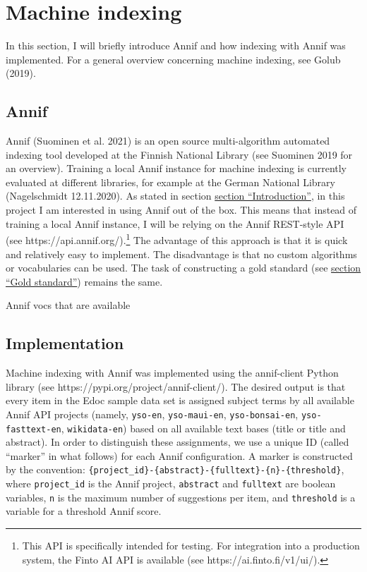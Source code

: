 \hypertarget{machine-indexing}{%
\section{Machine indexing}\label{machine-indexing}}

In this section, I will briefly introduce Annif and how indexing with
Annif was implemented. For a general overview concerning machine
indexing, see Golub (2019).

\hypertarget{annif}{%
\subsection{Annif}\label{annif}}

Annif (Suominen et al. 2021) is an open source multi-algorithm automated
indexing tool developed at the Finnish National Library (see Suominen
2019 for an overview). Training a local Annif instance for machine
indexing is currently evaluated at different libraries, for example at
the German National Library (Nagelschmidt 12.11.2020). As stated in
section \protect\hyperlink{introduction}{section ``Introduction''}, in
this project I am interested in using Annif out of the box. This means
that instead of training a local Annif instance, I will be relying on
the Annif REST-style API (see https://api.annif.org/).\footnote{This API
  is specifically intended for testing. For integration into a
  production system, the Finto AI API is available (see
  https://ai.finto.fi/v1/ui/).} The advantage of this approach is that
it is quick and relatively easy to implement. The disadvantage is that
no custom algorithms or vocabularies can be used. The task of
constructing a gold standard (see
\protect\hyperlink{gold-standard}{section ``Gold standard''}) remains
the same.

Annif vocs that are available

\hypertarget{implementation}{%
\subsection{Implementation}\label{implementation}}

Machine indexing with Annif was implemented using the annif-client
Python library (see https://pypi.org/project/annif-client/). The desired
output is that every item in the Edoc sample data set is assigned
subject terms by all available Annif API projects (namely,
\texttt{yso-en}, \texttt{yso-maui-en}, \texttt{yso-bonsai-en},
\texttt{yso-fasttext-en}, \texttt{wikidata-en}) based on all available
text bases (title or title and abstract). In order to distinguish these
assignments, we use a unique ID (called ``marker'' in what follows) for
each Annif configuration. A marker is constructed by the convention:
\texttt{\{project\_id\}-\{abstract\}-\{fulltext\}-\{n\}-\{threshold\}},
where \texttt{project\_id} is the Annif project, \texttt{abstract} and
\texttt{fulltext} are boolean variables, \texttt{n} is the maximum
number of suggestions per item, and \texttt{threshold} is a variable for
a threshold Annif score.

